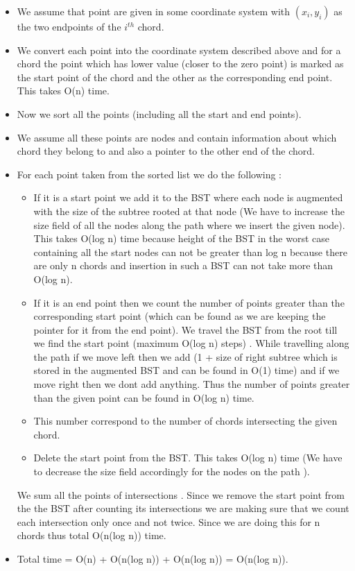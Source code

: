 \documentclass{article}
\begin{document}
\begin{itemize}
\item We assume that point are given in some coordinate system with $(x_i,y_i)$ as the two endpoints of the $i^{th}$ chord.
\item We convert each point into the coordinate system described above and for a chord the point which has lower value (closer to the zero point) is marked as the start point of the chord and the other as the corresponding end point.
This takes O(n) time.
\item Now we sort all the points (including all the start and end points).
\item We assume all these points are nodes and contain information about which chord they belong to and also a pointer to the other end of the chord. 
\item For each point taken from the sorted list we do the following :
	\begin{itemize}
	\item If it is a start point we add it to the BST where each node is augmented with the size of the subtree rooted at that node (We have to increase the size field of all the nodes along the path where we insert the given node). This takes O(log n) time because height of the BST in the worst case containing all the start nodes can not be greater than log n because there are only n chords and insertion in such a BST can not take more than O(log n).
	\item If it is an end point then we count the number of points greater than the corresponding start point (which can be found as we are keeping the pointer for it from the end point). We travel the BST from the root till we find the start point (maximum O(log n) steps) . While travelling along the path if we move left then we add (1 + size of right subtree which is stored in the augmented BST and can be found in O(1) time) and if we move right then we dont add anything. Thus the number of points greater than the given point can be found in O(log n) time. 
    \item This number correspond to the number of chords intersecting the given chord.
    \item Delete the start point from the BST. This takes O(log n) time (We have to decrease the size field accordingly for the nodes on the path ).
	\end{itemize}
	We sum all the points of intersections . Since we remove the start point from the the BST after counting its intersections we are making sure that we count each intersection only once and not twice. 
	Since we are doing this for n chords thus total O(n(log n)) time. 
\item Total time = O(n) + O(n(log n)) + O(n(log n)) = O(n(log n)).
\end{itemize}
\end{document}
